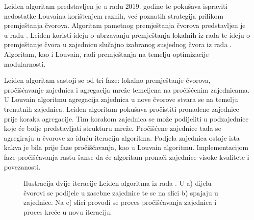 Leiden algoritam predstavljen je u radu \cite{traag2019louvain} 2019. godine te pokušava ispraviti nedostatke Louvaina korištenjem raznih, već poznatih strategija prilikom premještanja čvorova. Algoritam pametnog premještanja čvorova predstavljen je u radu \cite{waltman2013smart}. Leiden koristi ideju o ubrzavanju premještanja lokalnih iz rada \cite{ozaki2016simple} te ideju o premještanje čvora u zajednicu slučajno izabranog susjednog čvora iz rada \cite{traag2015faster}. Algoritam, kao i Louvain, radi premještanja na temelju optimizacije modularnosti.

Leiden algoritam sastoji se od tri faze: lokalno premještanje čvorova, pročišćavanje zajednica i agregacija mreže temeljena na pročišćenim zajednicama. U Louvain algoritmu agregacija zajednica u nove čvorove stvara se na temelju trenutnih zajednica. Leiden algoritam pokušava pročistiti pronađene zajednice prije koraka agregacije. Tim korakom zajednica se može podijeliti u podzajednice koje će bolje predstavljati strukturu mreže. Pročišćene zajednice tada se agregiraju u čvorove za iduću iteraciju algoritma. Podjela zajednica ostaje ista kakva je bila prije faze pročišćavanja, kao u Louvain algoritmu. Implementacijom faze pročišćavanja rastu šanse da će algoritam pronaći zajednice visoke kvalitete i povezanosti.

\begin{figure}
	\caption{Ilustracija dvije iteracije Leiden algoritma iz rada \cite{traag2019louvain}. U a) dijelu čvorovi se podijele u zasebne zajednice te se na slici b) spajaju u zajednice. Na c) slici provodi se proces pročišćavanja zajednica i proces kreće u novu iteraciju.}
	\label{fig:leiden}
\end{figure}

